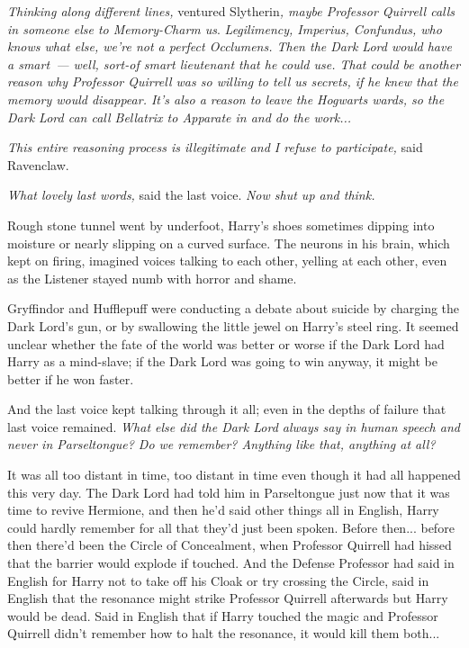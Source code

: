 \emph{Thinking along different lines,} ventured Slytherin\emph{, maybe Professor Quirrell calls in someone else to Memory-Charm us}. \emph{Legilimency, Imperius, Confundus, who knows what else, we're not a perfect Occlumens. Then the Dark Lord would have a smart~--- well, sort-of smart lieutenant that he could use. That could be another reason why Professor Quirrell was so willing to tell us secrets, if he knew that the memory would disappear. It's also a reason to leave the Hogwarts wards, so the Dark Lord can call Bellatrix to Apparate in and do the work...}

\emph{This entire reasoning process is illegitimate and I refuse to participate,} said Ravenclaw.

\emph{What lovely last words,} said the last voice. \emph{Now shut up and think.}

Rough stone tunnel went by underfoot, Harry's shoes sometimes dipping into moisture or nearly slipping on a curved surface. The neurons in his brain, which kept on firing, imagined voices talking to each other, yelling at each other, even as the Listener stayed numb with horror and shame.

Gryffindor and Hufflepuff were conducting a debate about suicide by charging the Dark Lord's gun, or by swallowing the little jewel on Harry's steel ring. It seemed unclear whether the fate of the world was better or worse if the Dark Lord had Harry as a mind-slave; if the Dark Lord was going to win anyway, it might be better if he won faster.

And the last voice kept talking through it all; even in the depths of failure that last voice remained. \emph{What else did the Dark Lord always say in human speech and never in Parseltongue? Do we remember? Anything like that, anything at all?}

It was all too distant in time, too distant in time even though it had all happened this very day. The Dark Lord had told him in Parseltongue just now that it was time to revive Hermione, and then he'd said other things all in English, Harry could hardly remember for all that they'd just been spoken. Before then... before then there'd been the Circle of Concealment, when Professor Quirrell had hissed that the barrier would explode if touched. And the Defense Professor had said in English for Harry not to take off his Cloak or try crossing the Circle, said in English that the resonance might strike Professor Quirrell afterwards but Harry would be dead. Said in English that if Harry touched the magic and Professor Quirrell didn't remember how to halt the resonance, it would kill them both...

